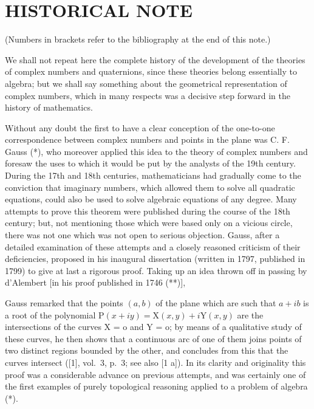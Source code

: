 \section*{HISTORICAL NOTE}
{}

(Numbers in brackets refer to the bibliography at the end of this note.)

We shall not repeat here the complete history of the development of the theories of complex numbers and quaternions, since these theories belong essentially to algebra; but we shall say something about the geometrical representation of complex numbers, which in many respects was a decisive step forward in the history of mathematics.

Without any doubt the first to have a clear conception of the one-to-one correspondence between complex numbers and points in the plane was C. F. Gauss (*), who moreover applied this idea to the theory of complex numbers and foresaw the uses to which it would be put by the analysts of the 19th century. During the 17th and 18th centuries, mathematicians had gradually come to the conviction that imaginary numbers, which allowed them to solve all quadratic equations, could also be used to solve algebraic equations of any degree. Many attempts to prove this theorem were published during the course of the 18th century; but, not mentioning those which were based only on a vicious circle, there was not one which was not open to serious objection. Gauss, after a detailed examination of these attempts and a closely reasoned criticism of their deficiencies, proposed in his inaugural dissertation (written in 1797, published in 1799) to give at last a rigorous proof. Taking up an idea thrown off in passing by d'Alembert {[}in his proof published in 1746 (**){]},

Gauss remarked that the points \((a, b)\) of the plane which are such that \(a + ib\) is a root of the polynomial \(\mathrm{P}(x + iy) = \mathrm{X}(x, y) + i\mathrm{Y}(x, y)\) are the intersections of the curves X = o and Y = o; by means of a qualitative study of these curves, he then shows that a continuous arc of one of them joins points of two distinct regions bounded by the other, and concludes from this that the curves intersect ({[}1{]}, vol.~3, p.~3; see also {[}1 a{]}). In its clarity and originality this proof was a considerable advance on previous attempts, and was certainly one of the first examples of purely topological reasoning applied to a problem of algebra (*).


